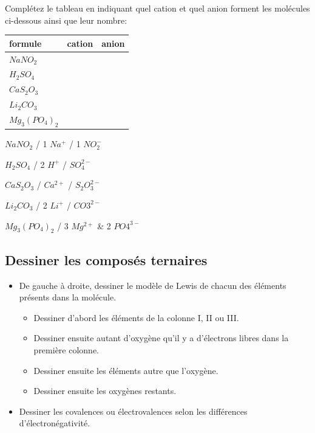 \documentclass[
  11pt,
  a4paper,
  openany]{book}
\providecommand{\tightlist}{%
  \setlength{\itemsep}{0pt}\setlength{\parskip}{0pt}}
\begin{document}
\begin{Exercise}
Complétez le tableau en indiquant quel cation et quel anion forment les molécules ci-dessous ainsi que leur nombre:

\end{Exercise}

\begin{longtable}[]{@{}lcc@{}}
\toprule\noalign{}
formule & cation & anion \\
\midrule\noalign{}
\endhead
\bottomrule\noalign{}
\endlastfoot
\(NaNO_2\) & & \\
\(H_2SO_4\) & & \\
\(CaS_2O_3\) & & \\
\(Li_2CO_3\) & & \\
\(Mg_3(PO_4)_2\) & & \\
\end{longtable}

\begin{Answer}
\(NaNO_2\) / 1 \(Na^+\) / 1 \(NO_2^-\)

\(H_2SO_4\) / 2 \(H^+\) / \(SO_4^{2-}\)

\(CaS_2O_3\) / \(Ca^{2+}\) / \(S_2O_3^{2-}\)

\(Li_2CO_3\) / 2 \(Li^+\) / \(CO3^{2-}\)

\(Mg_3(PO_4)_2\) / 3 \(Mg^{2+}\) \& 2 \(PO4^{3-}\)

\end{Answer}

\subsection{Dessiner les composés ternaires}\label{dessiner-les-composuxe9s-ternaires}

\begin{itemize}
\tightlist
\item
  De gauche à droite, dessiner le modèle de Lewis de chacun des éléments présents dans la molécule.

  \begin{itemize}
  \tightlist
  \item
    Dessiner d'abord les éléments de la colonne I, II ou III.
  \item
    Dessiner ensuite autant d'oxygène qu'il y a d'électrons libres dans la première colonne.
  \item
    Dessiner ensuite les éléments autre que l'oxygène.
  \item
    Dessiner ensuite les oxygènes restants.
  \end{itemize}
\item
  Dessiner les covalences ou électrovalences selon les différences d'électronégativité.
\end{itemize}
\end{document}
